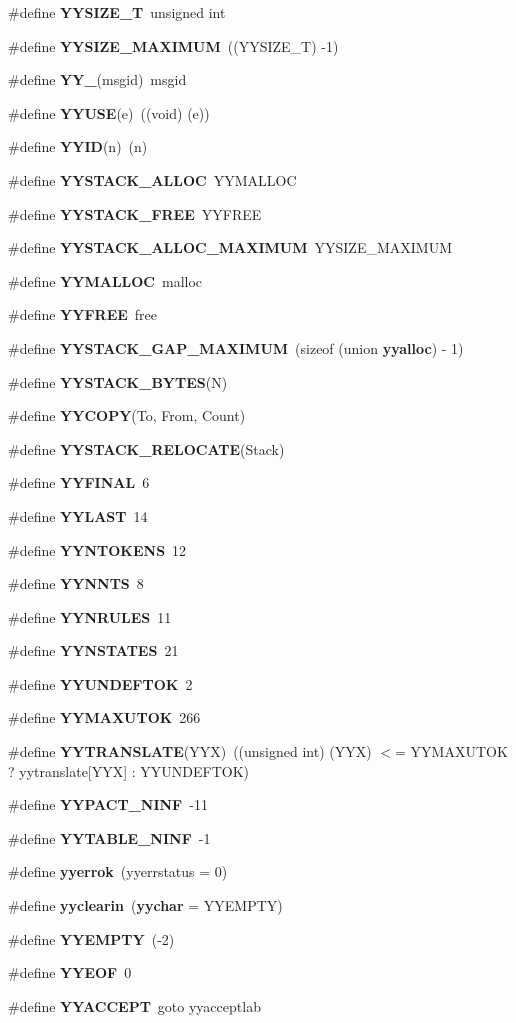 \begin{CompactItemize}
\item 
\#define {\bf YYSIZE\_\-T}~unsigned int
\item 
\#define {\bf YYSIZE\_\-MAXIMUM}~((YYSIZE\_\-T) -1)
\item 
\#define {\bf YY\_\-}(msgid)~msgid
\item 
\#define {\bf YYUSE}(e)~((void) (e))
\item 
\#define {\bf YYID}(n)~(n)
\item 
\#define {\bf YYSTACK\_\-ALLOC}~YYMALLOC
\item 
\#define {\bf YYSTACK\_\-FREE}~YYFREE
\item 
\#define {\bf YYSTACK\_\-ALLOC\_\-MAXIMUM}~YYSIZE\_\-MAXIMUM
\item 
\#define {\bf YYMALLOC}~malloc
\item 
\#define {\bf YYFREE}~free
\item 
\#define {\bf YYSTACK\_\-GAP\_\-MAXIMUM}~(sizeof (union {\bf yyalloc}) - 1)
\item 
\#define {\bf YYSTACK\_\-BYTES}(N)
\item 
\#define {\bf YYCOPY}(To, From, Count)
\item 
\#define {\bf YYSTACK\_\-RELOCATE}(Stack)
\item 
\#define {\bf YYFINAL}~6
\item 
\#define {\bf YYLAST}~14
\item 
\#define {\bf YYNTOKENS}~12
\item 
\#define {\bf YYNNTS}~8
\item 
\#define {\bf YYNRULES}~11
\item 
\#define {\bf YYNSTATES}~21
\item 
\#define {\bf YYUNDEFTOK}~2
\item 
\#define {\bf YYMAXUTOK}~266
\item 
\#define {\bf YYTRANSLATE}(YYX)~((unsigned int) (YYX) $<$= YYMAXUTOK ? yytranslate[YYX] : YYUNDEFTOK)
\item 
\#define {\bf YYPACT\_\-NINF}~-11
\item 
\#define {\bf YYTABLE\_\-NINF}~-1
\item 
\#define {\bf yyerrok}~(yyerrstatus = 0)
\item 
\#define {\bf yyclearin}~({\bf yychar} = YYEMPTY)
\item 
\#define {\bf YYEMPTY}~(-2)
\item 
\#define {\bf YYEOF}~0
\item 
\#define {\bf YYACCEPT}~goto yyacceptlab
\item 

\end{CompactItemize}
